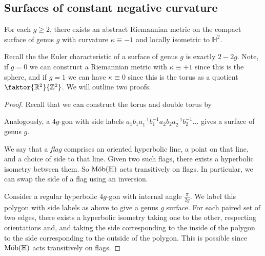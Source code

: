 \subsection{Surfaces of constant negative curvature}
\begin{theorem}
	For each $g \geq 2$, there exists an abstract Riemannian metric on the compact surface of genus $g$ with curvature $\kappa \equiv -1$ and locally isometric to $\mathbb H^2$.
\end{theorem}
Recall the the Euler characteristic of a surface of genus $g$ is exactly $2 - 2g$.
Note, if $g = 0$ we can construct a Riemannian metric with $\kappa \equiv +1$ since this is the sphere, and if $g = 1$ we can have $\kappa \equiv 0$ since this is the torus as a quotient $\faktor{\mathbb R^2}{\mathbb Z^2}$.
We will outline two proofs.
\begin{proof}
	Recall that we can construct the torus and double torus by
	\begin{center}
		\quad
	\end{center}
	Analogously, a $4g$-gon with side labels $a_1 b_1 a_1^{-1} b_1^{-1} a_2 b_2 a_2^{-1} b_2^{-1} \dots$ gives a surface of genus $g$.

	We say that a \textit{flag} comprises an oriented hyperbolic line, a point on that line, and a choice of side to that line.
	Given two such flags, there exists a hyperbolic isometry between them.
	So $\text{M\"ob}(\mathbb H)$ acts transitively on flags.
	In particular, we can swap the side of a flag using an inversion.

	Consider a regular hyperbolic $4g$-gon with internal angle $\frac{\pi}{2g}$.
	We label this polygon with side labels as above to give a genus $g$ surface.
	For each paired set of two edges, there exists a hyperbolic isometry taking one to the other, respecting orientations and, and taking the side corresponding to the inside of the polygon to the side corresponding to the outside of the polygon.
	This is possible since $\text{M\"ob}(\mathbb H)$ acts transitively on flags.


\end{proof}
